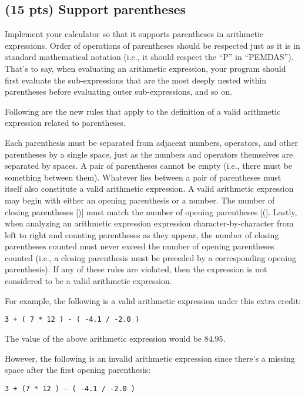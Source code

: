 \documentclass{article}
\begin{document}
\subsection{(15 pts) Support parentheses}

Implement your calculator so that it supports parentheses in arithmetic expressions. Order of operations of parentheses should be respected just as it is in standard mathematical notation (i.e., it should respect the ``P'' in ``PEMDAS''). That's to say, when evaluating an arithmetic expression, your program should first evaluate the sub-expressions that are the most deeply nested within parentheses before evaluating outer sub-expressions, and so on.

Following are the new rules that apply to the definition of a valid arithmetic expression related to parentheses.

Each parenthesis must be separated from adjacent numbers, operators, and other parentheses by a single space, just as the numbers and operators themselves are separated by spaces. A pair of parentheses cannot be empty (i.e., there must be something between them). Whatever lies between a pair of parentheses must itself also constitute a valid arithmetic expression. A valid arithmetic expression may begin with either an opening parenthesis or a number. The number of closing parentheses [)] must match the number of opening parentheses [(]. Lastly, when analyzing an arithmetic expression expression character-by-character from left to right and counting parentheses as they appear, the number of closing parentheses counted must never exceed the number of opening parentheses counted (i.e., a closing parenthesis must be preceded by a corresponding opening parenthesis). If any of these rules are violated, then the expression is not considered to be a valid arithmetic expression.

For example, the following is a valid arithmetic expression under this extra credit:

\begin{verbatim}
3 + ( 7 * 12 ) - ( -4.1 / -2.0 )
\end{verbatim}

The value of the above arithmetic expression would be $84.95$.

However, the following is an invalid arithmetic expression since there's a missing space after the first opening parenthesis:

\begin{verbatim}
3 + (7 * 12 ) - ( -4.1 / -2.0 )
\end{verbatim}
\end{document}
